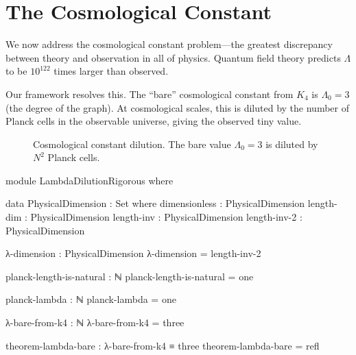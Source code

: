 \documentclass[11pt,a4paper]{book}
\def\text#1{#1}%
\begin{document}
\chapter{The Cosmological Constant}
\label{chap:cosmological-constant}

We now address the cosmological constant problem—the greatest discrepancy between 
theory and observation in all of physics. Quantum field theory predicts $\Lambda$ 
to be $10^{122}$ times larger than observed.

Our framework resolves this. The ``bare'' cosmological constant from $K_4$ is 
$\Lambda_0 = 3$ (the degree of the graph). At cosmological scales, this is diluted 
by the number of Planck cells in the observable universe, giving the observed tiny value.

\begin{figure}[h]
\centering
{}
\caption{Cosmological constant dilution. The bare value $\Lambda_0 = 3$ is diluted by $N^2$ Planck cells.}
\label{fig:lambda-dilution}
\end{figure}

\begin{code}
module LambdaDilutionRigorous where

  data PhysicalDimension : Set where
    dimensionless : PhysicalDimension
    length-dim    : PhysicalDimension
    length-inv    : PhysicalDimension
    length-inv-2  : PhysicalDimension
    
  λ-dimension : PhysicalDimension
  λ-dimension = length-inv-2
  
  planck-length-is-natural : ℕ
  planck-length-is-natural = one
  
  planck-lambda : ℕ
  planck-lambda = one
  
  λ-bare-from-k4 : ℕ
  λ-bare-from-k4 = three
  
  theorem-lambda-bare : λ-bare-from-k4 ≡ three
  theorem-lambda-bare = refl
\end{code}
\end{document}

